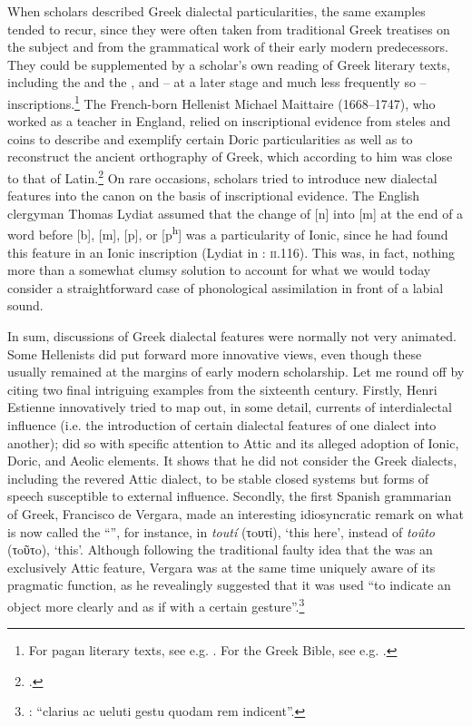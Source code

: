 When scholars described Greek dialectal particularities, the same examples tended to recur, since they were often taken from traditional Greek treatises on the subject and from the grammatical work of their early modern predecessors. They could be supplemented by a scholar’s own reading of Greek literary texts, including the  and the , and – at a later stage and much less frequently so – inscriptions.\footnote{For pagan literary texts, see e.g. \citet[]{Amerot1520, Amerot1530}. For the Greek Bible, see e.g. \citet{Pasor1632}.} The French-born Hellenist Michael Maittaire (1668–1747), who worked as a teacher in England, relied on inscriptional evidence from steles and coins to describe and exemplify certain Doric particularities as well as to reconstruct the ancient orthography of Greek, which according to him was close to that of Latin.\footnote{\citet[e.g. 161–167, 170, 184, 205–206, 211–212, 221, 240, 243]{Maittaire1706}.} On rare occasions, scholars tried to introduce new dialectal features into the canon on the basis of inscriptional evidence. The English clergyman Thomas Lydiat assumed that the change of [n] into [m] at the end of a word before [b], [m], [p], or [p\textsuperscript{h}] was a particularity of Ionic, since he had found this feature in an Ionic inscription (Lydiat in \citealt{Prideaux1676}: \textsc{ii}.116). This was, in fact, nothing more than a somewhat clumsy solution to account for what we would today consider a straightforward case of phonological assimilation in front of a labial sound.

In sum, discussions of Greek dialectal features were normally not very animated. Some Hellenists did put forward more innovative views, even though these usually remained at the margins of early modern scholarship. Let me round off by citing two final intriguing examples from the sixteenth century. Firstly, Henri Estienne innovatively tried to map out, in some detail, currents of interdialectal influence (i.e. the introduction of certain dialectal features of one dialect into another); \citet[22--28]{Estienne1581} did so with specific attention to Attic and its alleged adoption of Ionic, Doric, and Aeolic elements. It shows that he did not consider the Greek dialects, including the revered Attic dialect, to be stable closed systems but forms of speech susceptible to external influence. Secondly, the first Spanish grammarian of Greek, Francisco de Vergara, made an interesting idiosyncratic remark on what is now called the “”, for instance, in \textit{toutí} (τoυτί), ‘this here’, instead of \textit{toûto} (τoῦτo), ‘this’. Although following the traditional faulty idea that the  was an exclusively Attic feature, Vergara was at the same time uniquely aware of its pragmatic function, as he revealingly suggested that it was used “to indicate an object more clearly and as if with a certain gesture”.\footnote{\citet[218]{Vergara1537}: “clarius ac ueluti gestu quodam rem indicent”.}


